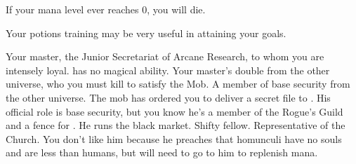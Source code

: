\documentclass[char]{guildcamp3}
\begin{document}
\begin{itemz}[Notes]
	\item If your mana level ever reaches 0, you will die.
	\item Your potions training may be very useful in attaining your goals.
\end{itemz}


\begin{contacts}
	\contact{\cNobleOne{}} Your master, the Junior Secretariat of Arcane Research, to whom you are intensely loyal.  has no magical ability.
	\contact{\cPoliOne{}} Your master's double from the other universe, who you must kill to satisfy the Mob.
	\contact{\cSpecOpTwo{}} A member of base security from the other universe. The mob has ordered you to deliver a secret file to \cSpecOpTwo{\them}. 
	\contact{\cRogueTwo{}} His official role is base security, but you know he's a member of the Rogue's Guild and a fence for \bMagicMob{}. He runs the black market. Shifty fellow.
	\contact{\cPaladin{}} Representative of the Church. You don't like him because he preaches that homunculi have no souls and are less than humans, but will need to go to him to replenish mana.
\end{contacts}
\end{document}

